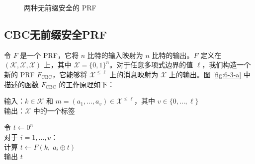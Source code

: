 \begin{figure}
  \centering
  
  \caption{两种无前缀安全的 PRF}
\end{figure}

\subsection{CBC无前缀安全PRF}

令 $F$ 是一个 PRF，它将 $n$ 比特的输入映射为 $n$ 比特的输出。$F$ 定义在 $(\mathcal{K},\mathcal{X},\mathcal{X})$ 上，其中 $\mathcal{X}=\{0,1\}^n$。对于任意多项式边界的值 $\ell$，我们构造一个新的 PRF $F_\mathrm{CBC}$，它能够将 $\mathcal{X}^{\leq\ell}$ 上的消息映射为 $\mathcal{X}$ 上的输出。图 \ref{fig:6-3-a} 中描述的函数 $F_\mathrm{CBC}$ 的工作原理如下：

\vspace*{5pt}

\hspace*{5pt} 输入：$k\in\mathcal{K}$ 和 $m=(a_1,\dots,a_v)\in\mathcal{X}^{\leq\ell}$，其中 $v\in\{0,\dots,\ell\}$\\
\hspace*{26pt} 输出：$\mathcal{X}$ 中的一个标签

\vspace*{5pt}

\hspace*{5pt} 令 $t\leftarrow0^n$\\
\hspace*{26pt} 对于 $i=1,\dots,v$：\\
\hspace*{50pt} 计算 $t\leftarrow F(k,\;a_i\oplus t)$\\
\hspace*{26pt} 输出 $t$

